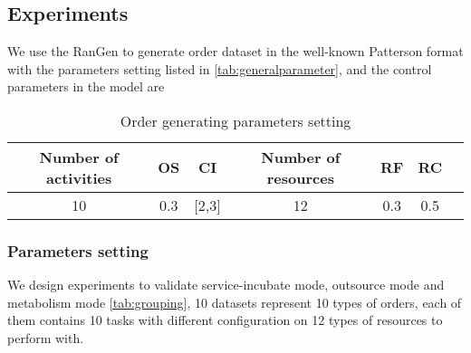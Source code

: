 %     
%     
%     
%     
%     


\subsection{Experiments} %
\label{ssub:case_design}
We use the RanGen\cite{Demeulemeester2003} to generate order dataset in the well-known Patterson format with the parameters setting listed in \autoref{tab:generalparameter}, and the control parameters in the model are

\begin{table}[htbp]
  \centering
  \scriptsize
	\caption{Order generating parameters setting}
    \begin{tabular}{ccccccc}
    \toprule
    \textbf{Number of activities} & \textbf{OS} & \textbf{CI} & \textbf{Number of resources} & \textbf{RF} & \textbf{RC} \\
    \midrule
     10  &   0.3    &  [2,3]     &   12     &  0.3     &   0.5     \\
    \bottomrule
    \end{tabular}%
    {}
  \label{tab:generalparameter}%
\end{table}%



\subsubsection{Parameters setting} %
\label{ssub:parameters_setting}
We design experiments to validate service-incubate mode, outsource mode and metabolism mode \autoref{tab:grouping}, 10 datasets represent 10 types of orders, each of them contains 10 tasks with different configuration on 12 types of resources to perform with. 

